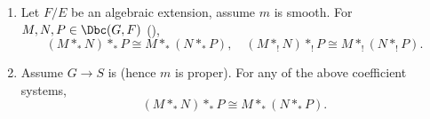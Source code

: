 \begin{proposition}
\begin{enumerate}
        \item[\textbf{(d) Algebraic adic coefficients, $*_*$.}] Let $F/E$ be an algebraic extension, assume $m$ is smooth. For $M, N, P \in \Dbc(G,F)$ (),
        $$ (M *_* N) *_* P \cong M *_* (N *_* P), \quad (M *_! N) *_! P \cong M *_! (N *_! P).$$

        \item[\textbf{(e) Proper case, $*_*$.}] Assume $G \to S$ is  (hence $m$ is proper). For any of the above coefficient systems,
        $$ (M *_* N) *_* P \cong M *_* (N *_* P).$$
    \end{enumerate}
\end{proposition}

